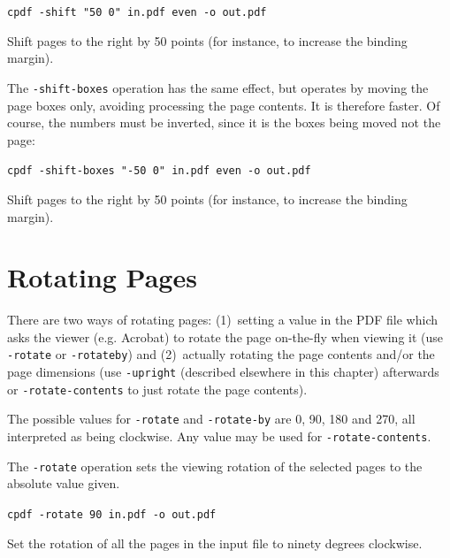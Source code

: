 \documentclass{book}
\begin{document}
  \begin{framed}
  \small\noindent\verb!cpdf -shift "50 0" in.pdf even -o out.pdf!

  \vspace{2.5mm}

  \noindent Shift pages to the right by 50 points (for instance, to increase
the binding margin).\end{framed}

\noindent The \texttt{-shift-boxes} operation has the same effect, but operates by moving the page boxes only, avoiding processing the page contents. It is therefore faster. Of course, the numbers must be inverted, since it is the boxes being moved not the page:

  \begin{framed}
  \small\noindent\verb!cpdf -shift-boxes "-50 0" in.pdf even -o out.pdf!

  \vspace{2.5mm}

  \noindent Shift pages to the right by 50 points (for instance, to increase
the binding margin).\end{framed}

  \section{Rotating Pages}

There are two ways of rotating pages: (1)~setting a value in the PDF file which
asks the viewer (e.g. Acrobat) to rotate the page on-the-fly when viewing it
(use \texttt{-rotate} or \texttt{-rotateby}) and (2)~actually rotating the page
contents and/or the page dimensions (use \texttt{-upright} (described elsewhere in this chapter) afterwards or
\texttt{-rotate-contents} to just rotate the page contents).

  The possible values for \texttt{-rotate} and \texttt{-rotate-by} are 0, 90,
180 and 270, all interpreted as being clockwise. Any value may be used for
\texttt{-rotate-contents}.
  
The \texttt{-rotate} operation sets the viewing rotation of the selected pages to
the absolute value given.

  \begin{framed}
  \noindent\small\verb!cpdf -rotate 90 in.pdf -o out.pdf!

  \vspace{2.5mm}
  \noindent Set the rotation of all the pages in the input file to ninety degrees clockwise.
  \end{framed}
\end{document}
